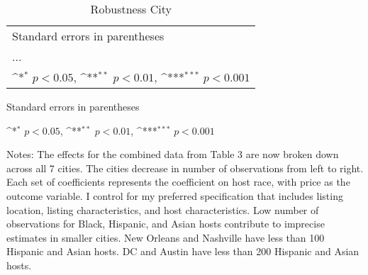 \documentclass[11pt, oneside]{article}
\begin{document}
\newpage
\begin{landscape}
	\begin{table}[htbp]\centering
		\def\sym#1{\ifmmode^{#1}\else\(^{#1}\)\fi}
		\caption{Robustness City}
		\begin{tabular}{l*{7}{c}}
			\hline\hline
			
			\hline\hline
			\multicolumn{8}{l}{\footnotesize Standard errors in parentheses}\\
			\multicolumn{8}{l}{\footnotesize ...}\\
			\multicolumn{8}{l}{\footnotesize \sym{*} \(p<0.05\), \sym{**} \(p<0.01\), \sym{***} \(p<0.001\)}\\
		\end{tabular}
		\begin{tablenotes}
			\item \footnotesize Standard errors in parentheses
			\item \footnotesize \sym{*} \(p<0.05\), \sym{**} \(p<0.01\), \sym{***} \(p<0.001\)
			
			\item Notes: The effects for the combined data from Table 3 are now broken down across all 7 cities. The cities decrease in number of observations from left to right. Each set of coefficients represents the coefficient on host race, with price as the outcome variable. I control for my preferred specification that includes listing location, listing characteristics, and host characteristics. Low number of observations for Black, Hispanic, and Asian hosts contribute to imprecise estimates in smaller cities. New Orleans and Nashville have less than 100 Hispanic and Asian hosts. DC and Austin have less than 200 Hispanic and Asian hosts. 
		\end{tablenotes}
	\end{table}
\end{landscape}
\newpage
\end{document}
